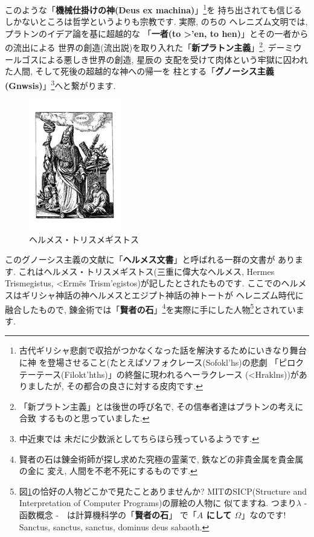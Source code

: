 \documentclass[b5j,8pt,twocolumn]{ltjsarticle}
\newcommand{\textgreek}[1]{\begingroup\fontencoding{LGR}\selectfont#1\endgroup}
\newcommand{\textgreek}[1]{\begingroup\fontencoding{LGR}\selectfont#1\endgroup}
\begin{document}
このような「\textbf{機械仕掛けの神(Deus ex machina)}」\footnote{
古代ギリシャ悲劇で収拾がつかなくなった話を解決するためにいきなり舞台に神
を登場させること(たとえばソフォクレース(\textgreek{Sofokl'hs})の悲劇
「ピロクテーテース(\textgreek{Filokt'hths})」の終盤に現われるヘーラクレース
(\textgreek{<Hraklns}))がありましたが, その都合の良さに対する皮肉です.}を
持ち出されても信じるしかないところは哲学というよりも宗教です. 実際, のちの
ヘレニズム文明では, プラトンのイデア論を基に超越的な
「\textbf{一者(\textgreek{to >'en}, to hen)}」とその一者からの流出による
世界の創造(流出説)を取り入れた「\textbf{新プラトン主義}」\footnote{
「新プラトン主義」とは後世の呼び名で, その信奉者達はプラトンの考えに合致
するものと思っていました.}, デーミウールゴスによる悪しき世界の創造, 星辰の
支配を受けて肉体という牢獄に囚われた人間, そして死後の超越的な神への帰一を
柱とする「\textbf{グノーシス主義(\textgreek{Gnwsis})}」\footnote{中近東では
未だに少数派としてちらほら残っているようです.}へと繋がります.
\newline


\begin{figure}
\includegraphics[width=4cm]{HermesTrismegistusCauc.pdf}
\caption{ヘルメス・トリスメギストス}
\label{fig:trismegistus}
\end{figure}

このグノーシス主義の文献に「\textbf{ヘルメス文書}」と呼ばれる一群の文書が
あります. これはヘルメス・トリスメギストス(三重に偉大なヘルメス, Hermes
 Trismegistus, \textgreek{<Erm\~es Trism'egistos})が記したとされたものです.
 ここでのヘルメスはギリシャ神話の神ヘルメスとエジプト神話の神トートが
ヘレニズム時代に融合したもので, 錬金術では「\textbf{賢者の石}」\footnote{
賢者の石は錬金術師が探し求めた究極の霊薬で, 鉄などの非貴金属を貴金属の金に
変え, 人間を不老不死にするものです.}を実際に手にした人物\footnote{
図\ref{fig:trismegistus}の恰好の人物どこかで見たことありませんか?
 MITのSICP(Structure and Interpretation of Computer Programs)の扉絵の人物に
似てますね. つまり$\lambda$ - 函数概念 -　は計算機科学の「\textbf{賢者の石}」
で「\textbf{$A$ にして $\Omega$}」なのです!
Sanctus, sanctus, sanctus, dominus deus sabaoth.}とされています\cite{錬金術}.
\newline 
\end{document}
